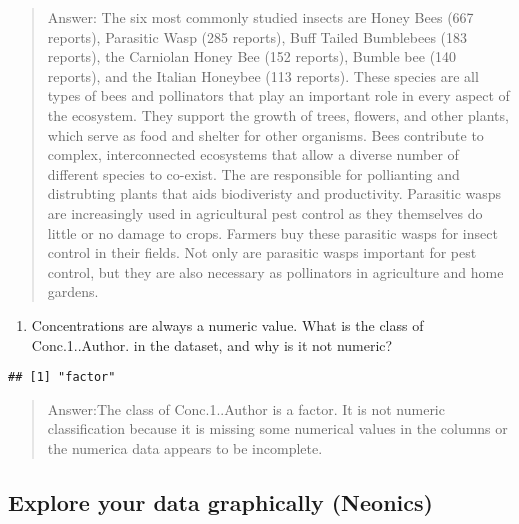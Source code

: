 \documentclass[]{article}
\newenvironment{Shaded}{\begin{snugshade}}{\end{snugshade}}
\newcommand{\DecValTok}[1]{\textcolor[rgb]{0.00,0.00,0.81}{#1}}
\newcommand{\KeywordTok}[1]{\textcolor[rgb]{0.13,0.29,0.53}{\textbf{#1}}}
\newcommand{\NormalTok}[1]{#1}
\newcommand{\OperatorTok}[1]{\textcolor[rgb]{0.81,0.36,0.00}{\textbf{#1}}}
\providecommand{\tightlist}{%
  \setlength{\itemsep}{0pt}\setlength{\parskip}{0pt}}
\begin{document}
\begin{quote}
Answer: The six most commonly studied insects are Honey Bees (667
reports), Parasitic Wasp (285 reports), Buff Tailed Bumblebees (183
reports), the Carniolan Honey Bee (152 reports), Bumble bee (140
reports), and the Italian Honeybee (113 reports). These species are all
types of bees and pollinators that play an important role in every
aspect of the ecosystem. They support the growth of trees, flowers, and
other plants, which serve as food and shelter for other organisms. Bees
contribute to complex, interconnected ecosystems that allow a diverse
number of different species to co-exist. The are responsible for
pollianting and distrubting plants that aids biodiveristy and
productivity. Parasitic wasps are increasingly used in agricultural pest
control as they themselves do little or no damage to crops. Farmers buy
these parasitic wasps for insect control in their fields. Not only are
parasitic wasps important for pest control, but they are also necessary
as pollinators in agriculture and home gardens.
\end{quote}

\begin{enumerate}
\def\labelenumi{\arabic{enumi}.}
\setcounter{enumi}{7}
\tightlist
\item
  Concentrations are always a numeric value. What is the class of
  Conc.1..Author. in the dataset, and why is it not numeric?
\end{enumerate}

\begin{Shaded}
\end{Shaded}

\begin{verbatim}
## [1] "factor"
\end{verbatim}

\begin{quote}
Answer:The class of Conc.1..Author is a factor. It is not numeric
classification because it is missing some numerical values in the
columns or the numerica data appears to be incomplete.
\end{quote}

\hypertarget{explore-your-data-graphically-neonics}{%
\subsection{Explore your data graphically
(Neonics)}\label{explore-your-data-graphically-neonics}}
\end{document}
